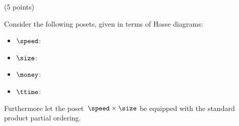 \documentclass[paper=8.125in:10.250in,pagesize=pdftex,
    headinclude=false,footinclude=false,oneside,egregdoesnotlikesansseriftitles]{kaobook}
\begin{document}
\begin{gradedexercise}\label{ex:ComposingDesignProblems} (5 points) 

Consider the following posets, given in terms of Hasse diagrams:
\begin{itemize}
\item $\speed$:

\begin{center}
\end{center}

\item $\size$:

\begin{center}
\end{center}

\item $\money$:

\begin{center}
\end{center}

\item $\ttime$:

\begin{center}
\end{center}
\end{itemize}
Furthermore let the poset~$\speed \times \size$ be equipped with the standard product partial ordering.


\end{gradedexercise}
\end{document}
